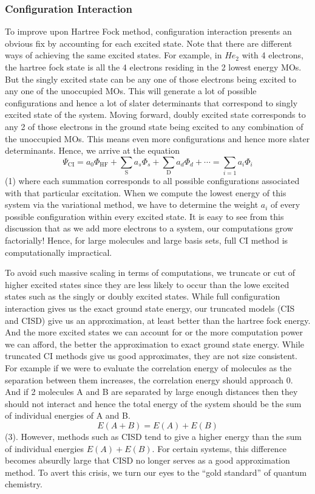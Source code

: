 \documentclass{article}
\begin{document}
    \subsubsection{Configuration Interaction}
      To improve upon Hartree Fock method, configuration interaction presents
      an obvious fix by accounting for each excited state. Note that there are
      different ways of achieving the same excited states. For example, in
      \(He_2\) with 4 electrons, the hartree fock state is all the 4 electrons
      residing in the 2 lowest energy MOs. But the singly
      excited state can be any one of those electrons being excited to any
      one of the unoccupied MOs. This will generate a lot of possible
      configurations and hence a lot of slater determinants that correspond
      to singly excited state of the system. Moving forward, doubly excited
      state corresponds to any 2 of those electrons in the ground state being
      excited to any combination of the unoccupied MOs. This means even more
      configurations and hence more slater determinants. Hence, we arrive
      at the equation
      \[\Psi_{\text{CI}} =  a_0\Phi_{\text{HF}} +\sum_{\text{S}}a_s\Phi_s +
      \sum_{\text{D}}a_d\Phi_d + \cdots = \sum_{i = 1} a_i\Phi_i\]
      (1) where each summation corresponds to all possible configurations associated
      with that particular excitation. When we compute the lowest energy of
      this system via the variational method, we have to determine the weight
      \(a_i\) of every possible
      configuration within every excited state. It is easy to see from this
      discussion that as we add more electrons to a system, our computations
      grow factorially! Hence, for large molecules and large basis sets,
      full CI method is computationally impractical.

      To avoid such massive scaling in terms of computations, we truncate or cut
      of higher excited states since they are less likely to occur than the lowe
      excited states such as the singly or doubly excited states. While full
      configuration interaction gives us the exact ground state energy, our
      truncated models (CIS and CISD) give us an approximation, at least
      better than the hartree fock energy. And the more excited states we
      can account for or the more computation power we can afford, the better
      the approximation to exact ground state energy.
      While truncated CI methods give us good approximates, they are not size
      consistent. For example if we were to evaluate the correlation energy of molecules as
      the separation between them increases, the correlation energy should
      approach 0. And if 2 molecules A and B are separated by large
      enough distances then they should not interact and hence the total
      energy of the system should be the sum of individual energies of A and
      B.
      \[E(A+B) = E(A) + E(B)\] (3).
      However, methods such as CISD tend to give a higher energy than the
      sum of individual energies \(E(A) + E(B)\). For certain systems, this
      difference becomes absurdly large that CISD no longer serves as a good
      approximation method. To avert this crisis, we turn our eyes to the
      ``gold standard'' of quantum chemistry.
\end{document}
